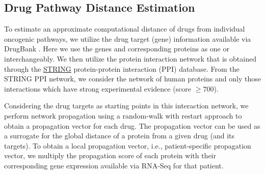\documentclass[pdflatex,sn-mathphys-num]{sn-jnl}%
\theoremstyle{thmstyleone}%
\theoremstyle{thmstyletwo}%
\theoremstyle{thmstylethree}%
\begin{document}
\subsection{Drug Pathway Distance Estimation}
To estimate an approximate computational distance of drugs from individual oncogenic pathways, we utilize the drug target (gene) information available via DrugBank \cite{knox2024drugbank}. Here we use the genes and corresponding proteins as one or interchangeably. We then utilize the protein interaction network that is obtained through the \href{https://string-db.org/}{STRING} protein-protein interaction (PPI) database. From the STRING PPI network, we consider the network of human proteins and only those interactions which have strong experimental evidence (score $\ge700$).

Considering the drug targets as starting points in this interaction network, we perform network propagation using a random-walk with restart approach \cite{sherif2022immune,mall2013kernel} to obtain a propagation vector for each drug. The propagation vector can be used as a surrogate for the global distance of a protein from a given drug (and its targets). To obtain a local propagation vector, i.e., patient-specific propagation vector, we multiply the propagation score of each protein with their corresponding gene expression available via RNA-Seq for that patient. 
\end{document}
